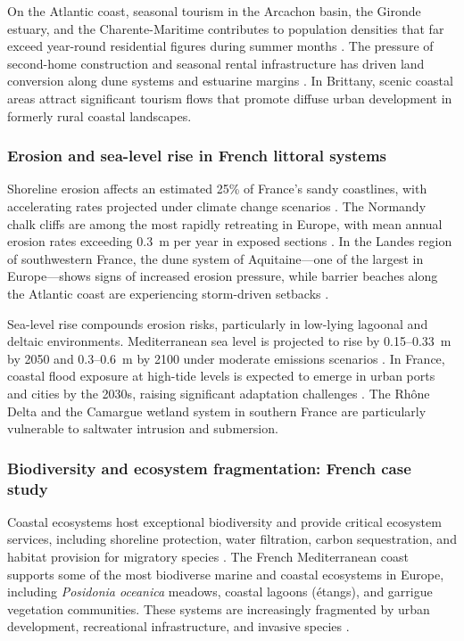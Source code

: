 \documentclass[remotesensing,article,submit,pdftex,moreauthors]{Definitions/mdpi}
\begin{document}
On the Atlantic coast, seasonal tourism in the Arcachon basin, the Gironde estuary, and the Charente-Maritime contributes to population densities that far exceed year-round residential figures during summer months \citep{blondy2016residences,observatoire2024charente}. The pressure of second-home construction and seasonal rental infrastructure has driven land conversion along dune systems and estuarine margins \citep{paskoff1988touristic,blondy2018secondhomes}. In Brittany, scenic coastal areas attract significant tourism flows that promote diffuse urban development in formerly rural coastal landscapes.

\subsubsection{Erosion and sea-level rise in French littoral systems}

Shoreline erosion affects an estimated 25\% of France's sandy coastlines, with accelerating rates projected under climate change scenarios \citep{euroion2004,meur-ferec2011}. The Normandy chalk cliffs are among the most rapidly retreating in Europe, with mean annual erosion rates exceeding 0.3~m per year in exposed sections \citep{costa2004falaises}. In the Landes region of southwestern France, the dune system of Aquitaine—one of the largest in Europe—shows signs of increased erosion pressure, while barrier beaches along the Atlantic coast are experiencing storm-driven setbacks \citep{castelle2018aquitaine,chaumillon2017storms}.

Sea-level rise compounds erosion risks, particularly in low-lying lagoonal and deltaic environments. Mediterranean sea level is projected to rise by 0.15–0.33~m by 2050 and 0.3–0.6~m by 2100 under moderate emissions scenarios \citep{IPCCar6wg2}. In France, coastal flood exposure at high-tide levels is expected to emerge in urban ports and cities by the 2030s, raising significant adaptation challenges \citep{LeCozannet2024}. The Rhône Delta and the Camargue wetland system in southern France are particularly vulnerable to saltwater intrusion and submersion.

\subsubsection{Biodiversity and ecosystem fragmentation: French case study}

Coastal ecosystems host exceptional biodiversity and provide critical ecosystem services, including shoreline protection, water filtration, carbon sequestration, and habitat provision for migratory species \citep{Sanchez2015}. The French Mediterranean coast supports some of the most biodiverse marine and coastal ecosystems in Europe, including \textit{Posidonia oceanica} meadows, coastal lagoons (étangs), and garrigue vegetation communities. These systems are increasingly fragmented by urban development, recreational infrastructure, and invasive species \citep{IPCC2022med}.
\end{document}
